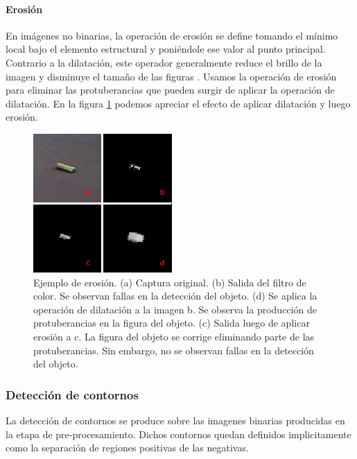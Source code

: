 	\paragraph{Erosi\'on}
En imágenes no binarias, la operación de erosión se define tomando el mínimo local bajo el elemento estructural y poniéndole ese valor al punto principal. Contrario a la dilatación, este operador generalmente reduce el brillo de la imagen y disminuye el tamaño de las figuras \cite{nasa-dilate-erode}. Usamos la operación de erosión para eliminar las protuberancias que pueden surgir de aplicar la operación de dilatación. En la figura \ref{fig:erode} podemos apreciar el efecto de aplicar dilatación y luego erosión.

\begin{figure}[tpb]
\begin{center}
  \includegraphics[scale=0.8]{figuras/erosion.png}
\end{center}
  \caption{\small Ejemplo de erosión. (a) Captura original. (b) Salida del filtro de color. Se observan fallas en la detección del objeto. (d) Se aplica la operación de dilatación a la imagen b. Se observa la producción de protuberancias en la figura del objeto. (c) Salida luego de aplicar erosión a c. La figura del objeto se corrige eliminando parte de las protuberancias. Sin embargo, no se observan fallas en la detección del objeto. }
  \label{fig:erode}
\end{figure}

	\subsubsection{Detección de contornos}
	La detección de contornos se produce sobre las imagenes binarias producidas en la etapa de pre-procesamiento. Dichos contornos
	quedan definidos implicitamente como la separación de regiones positivas de las negativas. 
	
